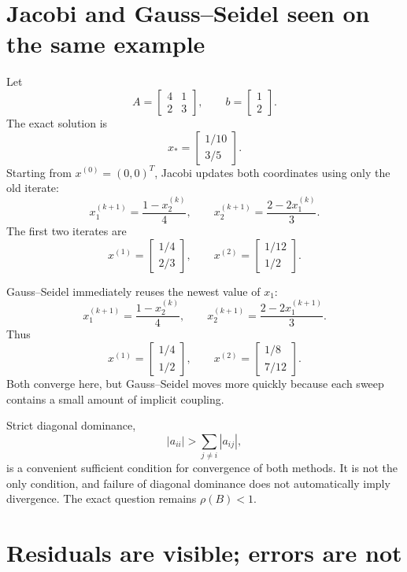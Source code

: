 \section{Jacobi and Gauss--Seidel seen on the same example}

Let
\[
  A=
  \begin{bmatrix}
    4&1\\
    2&3
  \end{bmatrix},
  \qquad
  b=
  \begin{bmatrix}
    1\\2
  \end{bmatrix}.
\]
The exact solution is
\[
  x_*=
  \begin{bmatrix}
    1/10\\3/5
  \end{bmatrix}.
\]
Starting from \(x^{(0)}=(0,0)^T\), Jacobi updates both coordinates using only the old iterate:
\[
  x_1^{(k+1)}=\frac{1-x_2^{(k)}}4,
  \qquad
  x_2^{(k+1)}=\frac{2-2x_1^{(k)}}3.
\]
The first two iterates are
\[
  x^{(1)}=
  \begin{bmatrix}1/4\\2/3\end{bmatrix},
  \qquad
  x^{(2)}=
  \begin{bmatrix}1/12\\1/2\end{bmatrix}.
\]

Gauss--Seidel immediately reuses the newest value of \(x_1\):
\[
  x_1^{(k+1)}=\frac{1-x_2^{(k)}}4,
  \qquad
  x_2^{(k+1)}=\frac{2-2x_1^{(k+1)}}3.
\]
Thus
\[
  x^{(1)}=
  \begin{bmatrix}1/4\\1/2\end{bmatrix},
  \qquad
  x^{(2)}=
  \begin{bmatrix}1/8\\7/12\end{bmatrix}.
\]
Both converge here, but Gauss--Seidel moves more quickly because each sweep contains a small amount of implicit coupling.

Strict diagonal dominance,
\[
  |a_{ii}|>\sum_{j\ne i}|a_{ij}|,
\]
is a convenient sufficient condition for convergence of both methods.  It is not the only condition, and failure of diagonal dominance does not automatically imply divergence.  The exact question remains \(\rho(B)<1\).

\section{Residuals are visible; errors are not}

